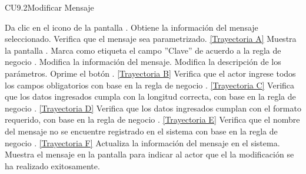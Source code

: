 \begin{UseCase}{CU9.2}{Modificar Mensaje}
{\begin{itemize}
		\end{itemize}}
	\end{UseCase}
	\begin{UCtrayectoria}
		\UCpaso[\UCactor] Da clic en el icono \editar de la pantalla .
		\UCpaso[\UCsist] Obtiene la información del mensaje seleccionado.	
		\UCpaso[\UCsist] Verifica que el mensaje sea parametrizado. \hyperlink{CU9-2:TAA}{[Trayectoria A]}
		\UCpaso[\UCsist] Muestra la pantalla .
		\UCpaso[\UCsist] Marca como etiqueta el campo ''Clave'' de acuerdo a la regla de negocio .
		\UCpaso[\UCactor] Modifica la información del mensaje. \label{CU9.2-P6}
		\UCpaso[\UCactor] Modifica la descripción de los parámetros.
		\UCpaso[\UCactor]Oprime el botón . \label{CU9.2-P8} \hyperlink{CU9-2:TAB}{[Trayectoria B]}
		\UCpaso[\UCsist] Verifica que el actor ingrese todos los campos obligatorios con base en la regla de negocio . \hyperlink{CU9-2:TAC}{[Trayectoria C]}
		\UCpaso[\UCsist] Verifica que los datos ingresados cumpla con la longitud correcta, con base en la regla de negocio . \hyperlink{CU9-2:TAD}{[Trayectoria D]}
		\UCpaso[\UCsist] Verifica que los datos ingresados cumplan con el formato requerido, con base en la regla de negocio . \hyperlink{CU9-2:TAE}{[Trayectoria E]}
		\UCpaso[\UCsist] Verifica que el nombre del mensaje no se encuentre registrado en el sistema con base en la regla de negocio . \hyperlink{CU9-2:TAF}{[Trayectoria F]} 
		\UCpaso[\UCsist] Actualiza la información del mensaje en el sistema.
		\UCpaso[\UCsist] Muestra el mensaje  en la pantalla  para indicar al actor que el la modificación se ha realizado exitosamente.
	\end{UCtrayectoria}		
